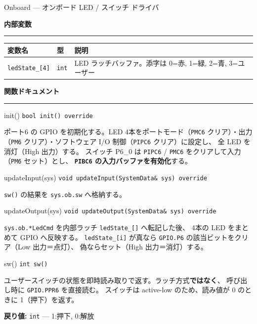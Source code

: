 \documentclass[a4paper,11pt,dvipdfmx]{jsarticle}
\makeatletter
\newcommand{\apisection}[1]{%
  \par\addvspace{4mm}%
  {\normalsize\bfseries\color{headerblue} #1}%
  \par\vspace{-1mm}%
  {\color{accentblue!40}\rule{\linewidth}{0.5pt}}%
  \par\nobreak\vspace{2mm}%
  \@afterheading
}
\makeatother
\begin{document}
\begin{apibox}{Onboard --- オンボード LED / スイッチ ドライバ}
\apisection{内部変数}

\begin{tabularx}{\textwidth}{l l X}
\toprule
\textbf{変数名} & \textbf{型} & \textbf{説明} \\
\midrule
\texttt{ledState\_[4]} & \texttt{int} & LED ラッチバッファ。添字は 0=赤, 1=緑, 2=青, 3=ユーザー \\
\bottomrule
\end{tabularx}

\apisection{関数ドキュメント}

\begin{funcblock}{init()}
\texttt{bool init() override}

\vspace{1.5mm}
ポート6 の GPIO を初期化する。LED 4本をポートモード（\texttt{PMC6} クリア）・出力
（\texttt{PM6} クリア）・ソフトウェア I/O 制御（\texttt{PIPC6} クリア）に設定し、
全 LED を消灯（High 出力）する。
スイッチ P6\_0 は \texttt{PIPC6} / \texttt{PMC6} をクリアして入力（\texttt{PM6} セット）とし、
\textbf{\texttt{PIBC6} の入力バッファを有効化}する。
\end{funcblock}

\begin{funcblock}{updateInput(sys)}
\texttt{void updateInput(SystemData\& sys) override}

\vspace{1.5mm}
\texttt{sw()} の結果を \texttt{sys.ob.sw} へ格納する。
\end{funcblock}

\begin{funcblock}{updateOutput(sys)}
\texttt{void updateOutput(SystemData\& sys) override}

\vspace{1.5mm}
\texttt{sys.ob.*LedCmd} を内部ラッチ \texttt{ledState\_[]} へ転記した後、
4本の LED をまとめて GPIO へ反映する。
\texttt{ledState\_[i]} が真なら \texttt{GPIO.P6} の該当ビットをクリア（Low 出力＝点灯）、
偽ならセット（High 出力＝消灯）する。
\end{funcblock}

\begin{funcblock}{sw()}
\texttt{int sw()}

\vspace{1.5mm}
ユーザースイッチの状態を即時読み取りで返す。ラッチ方式\textbf{ではなく}、
呼び出し時に \texttt{GPIO.PPR6} を直接読む。
スイッチは active-low のため、読み値が 0 のときに 1（押下）を返す。

\vspace{1.5mm}
\textbf{戻り値:} \texttt{int} --- 1:押下, 0:解放


\end{funcblock}
\end{apibox}
\end{document}
